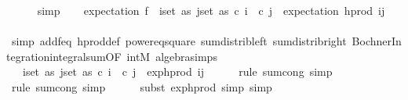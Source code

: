 \begin{isabellebody}
\ \ \ \ \isamarkupfalse%
\ simp\isanewline
\isanewline
\ \ \isamarkupfalse%
\ {\isachardoublequoteopen}expectation\ f\ {\isacharequal}{\kern0pt}\ {\isacharparenleft}{\kern0pt}{\isasymSum}i{\isasymin}set\ as{\isachardot}{\kern0pt}\ {\isacharparenleft}{\kern0pt}{\isasymSum}j{\isasymin}set\ as{\isachardot}{\kern0pt}\ c\ i\ {\isacharasterisk}{\kern0pt}\ c\ j\ {\isacharasterisk}{\kern0pt}\ expectation\ {\isacharparenleft}{\kern0pt}h{\isacharunderscore}{\kern0pt}prod\ {\isacharbrackleft}{\kern0pt}i{\isacharcomma}{\kern0pt}j{\isacharbrackright}{\kern0pt}{\isacharparenright}{\kern0pt}{\isacharparenright}{\kern0pt}{\isacharparenright}{\kern0pt}{\isachardoublequoteclose}\isanewline
\ \ \ \ \isamarkupfalse%
\ {\isacharparenleft}{\kern0pt}simp\ add{\isacharcolon}{\kern0pt}f{\isacharunderscore}{\kern0pt}eq\ h{\isacharunderscore}{\kern0pt}prod{\isacharunderscore}{\kern0pt}def\ power{}{\isacharunderscore}{\kern0pt}eq{\isacharunderscore}{\kern0pt}square\ sum{\isacharunderscore}{\kern0pt}distrib{\isacharunderscore}{\kern0pt}left\ sum{\isacharunderscore}{\kern0pt}distrib{\isacharunderscore}{\kern0pt}right\ Bochner{\isacharunderscore}{\kern0pt}Integration{\isachardot}{\kern0pt}integral{\isacharunderscore}{\kern0pt}sum{\isacharbrackleft}{\kern0pt}OF\ int{\isacharunderscore}{\kern0pt}M{\isacharbrackright}{\kern0pt}\ algebra{\isacharunderscore}{\kern0pt}simps{\isacharparenright}{\kern0pt}\isanewline
\ \ \isamarkupfalse%
\ \isamarkupfalse%
\ {\isachardoublequoteopen}{\isachardot}{\kern0pt}{\isachardot}{\kern0pt}{\isachardot}{\kern0pt}\ {\isacharequal}{\kern0pt}\ {\isacharparenleft}{\kern0pt}{\isasymSum}i{\isasymin}set\ as{\isachardot}{\kern0pt}\ {\isacharparenleft}{\kern0pt}{\isasymSum}j{\isasymin}set\ as{\isachardot}{\kern0pt}\ c\ i\ {\isacharasterisk}{\kern0pt}\ c\ j\ {\isacharasterisk}{\kern0pt}\ exp{\isacharunderscore}{\kern0pt}h{\isacharunderscore}{\kern0pt}prod\ {\isacharbrackleft}{\kern0pt}i{\isacharcomma}{\kern0pt}j{\isacharbrackright}{\kern0pt}{\isacharparenright}{\kern0pt}{\isacharparenright}{\kern0pt}{\isachardoublequoteclose}\isanewline
\ \ \ \ \isamarkupfalse%
\ {\isacharparenleft}{\kern0pt}rule\ sum{\isachardot}{\kern0pt}cong{\isacharcomma}{\kern0pt}\ simp{\isacharparenright}{\kern0pt}\isanewline
\ \ \ \ \isamarkupfalse%
\ {\isacharparenleft}{\kern0pt}rule\ sum{\isachardot}{\kern0pt}cong{\isacharcomma}{\kern0pt}\ simp{\isacharparenright}{\kern0pt}\isanewline
\ \ \ \ \isamarkupfalse%
\ {\isacharparenleft}{\kern0pt}subst\ exp{\isacharunderscore}{\kern0pt}h{\isacharunderscore}{\kern0pt}prod{\isacharcomma}{\kern0pt}\ simp{\isacharcomma}{\kern0pt}\ simp{\isacharparenright}{\kern0pt}\isanewline

\end{isabellebody}
